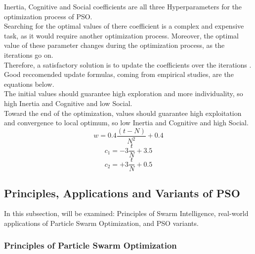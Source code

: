 Inertia, Cognitive and Social coefficients are all three Hyperparameters for the optimization process of PSO.
\\[0.3cm]Searching for the optimal values of there coefficient is a complex and expensive task, as it would require another optimization process.
Moreover, the optimal value of these parameter changes during the optimization process, as the iterations go on.
\\[0.3cm]Therefore, a satisfactory solution is to update the coefficients over the iterations \cite{Tesi-3.2}.
Good reccomended update formulas, coming from empirical studies, are the equations below.
\\[0.3cm]The initial values should guarantee high exploration and more individuality, so high Inertia and Cognitive and low Social.
\\[0.3cm]Toward the end of the optimization, values should guarantee high exploitation and convergence to local optimum, so low Inertia and Cognitive and high Social.
\begin{equation}
	w = 0.4\frac{(t-N)}{N^2} + 0.4
\end{equation}
\begin{equation}
	c_1 = -3\frac{t}{N} + 3.5
\end{equation}
\begin{equation}
	c_2 = +3\frac{t}{N} + 0.5
\end{equation}

\subsection{Principles, Applications and Variants of PSO}

In this subsection, will be examined: Principles of Swarm Intelligence, real-world applications of Particle Swarm Optimization, and PSO variants.

\subsubsection{Principles of Particle Swarm Optimization}

